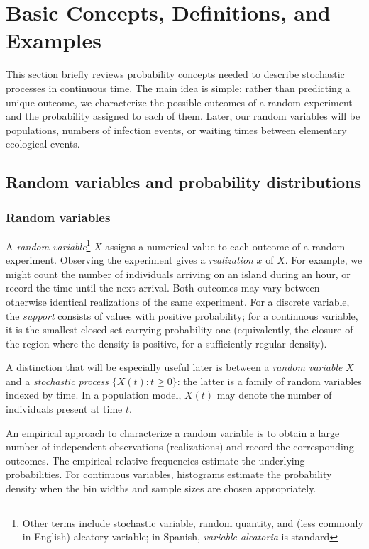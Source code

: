 \section{Basic Concepts, Definitions, and Examples}
\label{sec:basic_concepts}

This section briefly reviews probability concepts needed to describe stochastic processes in continuous time. The main idea is simple: rather than predicting a unique outcome, we characterize the possible outcomes of a random experiment and the probability assigned to each of them. Later, our random variables will be populations, numbers of infection events, or waiting times between elementary ecological events.

\subsection{Random variables and probability distributions}

\subsubsection{Random variables}
A \emph{random variable}\footnote{Other terms include stochastic variable, random quantity, and (less commonly in English) aleatory variable; in Spanish, \emph{variable aleatoria} is standard} $X$ assigns a numerical value to each outcome of a random experiment. Observing the experiment gives a \emph{realization} $x$ of $X$. For example, we might count the number of individuals arriving on an island during an hour, or record the time until the next arrival. Both outcomes may vary between otherwise identical realizations of the same experiment. For a discrete variable, the \emph{support} consists of values with positive probability; for a continuous variable, it is the smallest closed set carrying probability one (equivalently, the closure of the region where the density is positive, for a sufficiently regular density).

A distinction that will be especially useful later is between a \emph{random variable} $X$ and a \emph{stochastic process} $\{X(t):t\geq 0\}$: the latter is a family of random variables indexed by time. In a population model, $X(t)$ may denote the number of individuals present at time $t$.

An empirical approach to characterize a random variable is to obtain a large number of independent observations (realizations) and record the corresponding outcomes. The empirical relative frequencies estimate the underlying probabilities. For continuous variables, histograms estimate the probability density when the bin widths and sample sizes are chosen appropriately.

